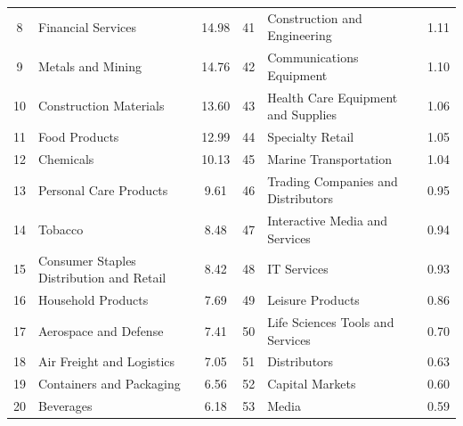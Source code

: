 \documentclass[12pt]{article}
\begin{document}
\begin{landscape}
\begin{table}[!ht]
\begin{tabular}{clcclc}
    8 &                                 Financial Services &               14.98 &    41 &                     Construction and Engineering &                1.11 \\
    9 &                                  Metals and Mining &               14.76 &    42 &                         Communications Equipment &                1.10 \\
   10 &                             Construction Materials &               13.60 &    43 &               Health Care Equipment and Supplies &                1.06 \\
   11 &                                      Food Products &               12.99 &    44 &                                 Specialty Retail &                1.05 \\
   12 &                                          Chemicals &               10.13 &    45 &                            Marine Transportation &                1.04 \\
   13 &                             Personal Care Products &                9.61 &    46 &               Trading Companies and Distributors &                0.95 \\
   14 &                                            Tobacco &                8.48 &    47 &                   Interactive Media and Services &                0.94 \\
   15 &           Consumer Staples Distribution and Retail &                8.42 &    48 &                                      IT Services &                0.93 \\
   16 &                                 Household Products &                7.69 &    49 &                                 Leisure Products &                0.86 \\
   17 &                              Aerospace and Defense &                7.41 &    50 &                 Life Sciences Tools and Services &                0.70 \\
   18 &                          Air Freight and Logistics &                7.05 &    51 &                                     Distributors &                0.63 \\
   19 &                           Containers and Packaging &                6.56 &    52 &                                  Capital Markets &                0.60 \\
   20 &                                          Beverages &                6.18 &    53 &                                            Media &                0.59 \\

\end{tabular}
\end{table}
\end{landscape}
\end{document}
